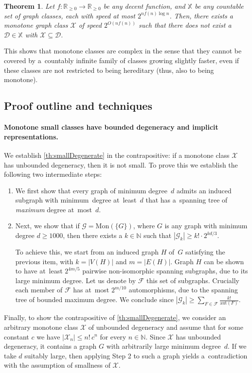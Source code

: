 \documentclass[letterpaper,11pt]{article}
\newcommand{\Fc}{\mathcal{F}}
\newcommand{\Gc}{\mathcal{G}}
\newcommand{\Xc}{\mathcal{X}}
\newtheorem{theorem}{Theorem}[section]
\theoremstyle{definition}
\theoremstyle{remark}
\newcommand{\mon}{\mathrm{Mon}}
\newcommand{\aut}{\mathrm{aut}}
\renewcommand{\leq}{\leqslant}
\renewcommand{\geq}{\geqslant}
\begin{document}
\def\complex{Let $f:\mathbb{R}_{\geq 0}\rightarrow \mathbb{R}_{\geq 0}$ be any decent function, and $\mathbb{X}$ be any countable set of graph classes, each with speed at most $2^{nf(n)\log n}$. Then, there exists a monotone graph class $\mathcal{X}$ of speed $2^{O(nf(n))}$ such that there does not exist a $\mathcal{D} \in \mathbb{X}$ with $\mathcal{X}\subseteq  \mathcal{D}$.}
\begin{theorem}\label{Thm:complex} 	
	\complex
\end{theorem}
This shows that monotone classes are complex in the sense that they cannot be covered by a~countably infinite family of classes growing slightly faster, even if these classes are not restricted to being hereditary (thus, also to being monotone).

	\subsection{Proof outline and techniques}\label{sec:techneques}
	\label{sec:proof-outline}

	\paragraph{Monotone small classes have bounded degeneracy and implicit representations.}

        We establish \cref{th:smallDegenerate} in the contrapositive: if a monotone class $\Xc$ has unbounded degeneracy, then it is not small.
        To prove this we establish the following two intermediate steps: 
\begin{enumerate}
\item  We first show that every graph of minimum degree~$d$ admits an induced subgraph with minimum~degree at~least~$d$ that has a~spanning tree of \emph{maximum} degree at~most~$d$.  
  
\item Next, we show that if $\Gc = \mon(\{G\})$, where $G$ is any graph with minimum degree $d \geq 1000$, then there exists a $k \in \mathbb{N}$ such that $|\Gc_k| \geq k! \cdot 2^{kd/3}.$
  
          To achieve this, we start from an induced graph $H$ of~$G$ satisfying the previous item, with $k = |V(H)|$ and $m = |E(H)|$.
          Graph $H$ can be shown to have at~least $2^{4m/5}$ pairwise non-isomorphic spanning subgraphs, due to its large minimum degree.
          Let us denote by $\Fc$ this set of subgraphs.
          Crucially each member of $\Fc$ has at~most $2^{m/10}$ automorphisms, due to the spanning tree of bounded maximum degree.
          We conclude since $|\Gc_k| \geq \sum_{F \in \Fc} \frac{k!}{\aut(F)}$.   
\end{enumerate}
Finally, to show the contrapositive of \cref{th:smallDegenerate}, we consider an arbitrary monotone class $\mathcal{X}$ of unbounded degeneracy and assume that for some constant $c$ we have $|\Xc_n| \leq n!\,c^n$ for every $n \in \mathbb{N}$.
Since $\Xc$ has unbounded degeneracy, it contains a graph $G$ with arbitrarily large minimum degree~$d$.
If we take $d$ suitably large, then applying Step 2 to such a graph yields a~contradiction with the assumption of smallness of $\Xc$.
\end{document}

